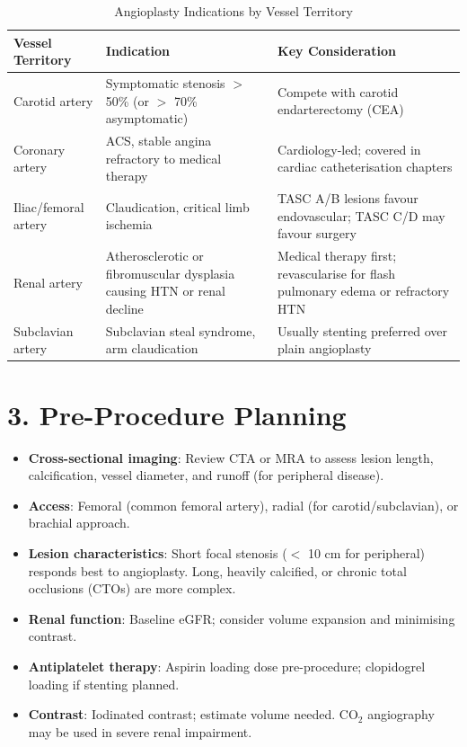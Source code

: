 \begin{table}[h]
\centering
\begin{tabular}{@{}p{}p{}p{}@{}}
\hline
\textbf{Vessel Territory} & \textbf{Indication} & \textbf{Key Consideration} \\
\hline
Carotid artery & Symptomatic stenosis $>$ 50\% (or $>$ 70\% asymptomatic) & Compete with carotid endarterectomy (CEA) \\
Coronary artery & ACS, stable angina refractory to medical therapy & Cardiology-led; covered in cardiac catheterisation chapters \\
Iliac/femoral artery & Claudication, critical limb ischemia & TASC A/B lesions favour endovascular; TASC C/D may favour surgery \\
Renal artery & Atherosclerotic or fibromuscular dysplasia causing HTN or renal decline & Medical therapy first; revascularise for flash pulmonary edema or refractory HTN \\
Subclavian artery & Subclavian steal syndrome, arm claudication & Usually stenting preferred over plain angioplasty \\
\hline
\end{tabular}
\caption{Angioplasty Indications by Vessel Territory}
\end{table}


\section{3. Pre-Procedure Planning}

\begin{itemize}
  \item \textbf{Cross-sectional imaging}: Review CTA or MRA to assess lesion length, calcification, vessel diameter, and runoff (for peripheral disease).
  \item \textbf{Access}: Femoral (common femoral artery), radial (for carotid/subclavian), or brachial approach.
  \item \textbf{Lesion characteristics}: Short focal stenosis ($<$ 10 cm for peripheral) responds best to angioplasty. Long, heavily calcified, or chronic total occlusions (CTOs) are more complex.
  \item \textbf{Renal function}: Baseline eGFR; consider volume expansion and minimising contrast.
  \item \textbf{Antiplatelet therapy}: Aspirin loading dose pre-procedure; clopidogrel loading if stenting planned.
  \item \textbf{Contrast}: Iodinated contrast; estimate volume needed. CO$_2$ angiography may be used in severe renal impairment.
\end{itemize}

